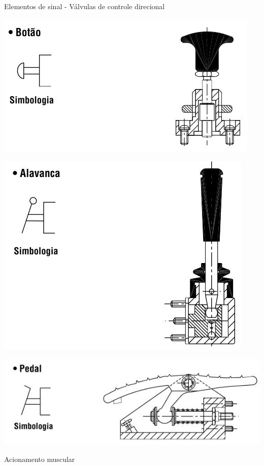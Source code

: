 \begin{frame}{Elementos de sinal - Válvulas de controle direcional}
	\begin{minipage}[c]{0.48\linewidth}
		\centering
		\includegraphics[width=1\linewidth]{Figuras/Ch14/fig09}
	\end{minipage}
	\hfill
	\begin{minipage}[c]{0.48\linewidth}
		\centering
		\includegraphics[width=1\linewidth]{Figuras/Ch14/fig10}
	\end{minipage}

	\centering
	\includegraphics[width=0.5\linewidth]{Figuras/Ch14/fig11}
	
	\medskip
	
	Acionamento muscular
\end{frame}



